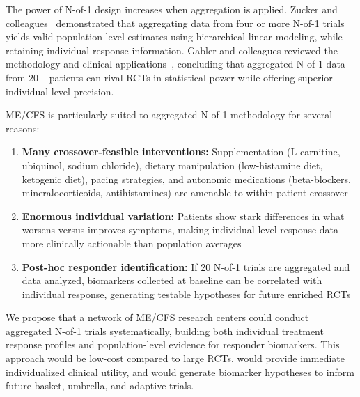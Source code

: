 The power of N-of-1 design increases when aggregation is applied. Zucker and colleagues~\cite{Zucker2010} demonstrated that aggregating data from four or more N-of-1 trials yields valid population-level estimates using hierarchical linear modeling, while retaining individual response information. Gabler and colleagues reviewed the methodology and clinical applications~\cite{Gabler2011}, concluding that aggregated N-of-1 data from 20+ patients can rival RCTs in statistical power while offering superior individual-level precision.

ME/CFS is particularly suited to aggregated N-of-1 methodology for several reasons:
\begin{enumerate}
    \item \textbf{Many crossover-feasible interventions:} Supplementation (L-carnitine, ubiquinol, sodium chloride), dietary manipulation (low-histamine diet, ketogenic diet), pacing strategies, and autonomic medications (beta-blockers, mineralocorticoids, antihistamines) are amenable to within-patient crossover
    \item \textbf{Enormous individual variation:} Patients show stark differences in what worsens versus improves symptoms, making individual-level response data more clinically actionable than population averages
    \item \textbf{Post-hoc responder identification:} If 20 N-of-1 trials are aggregated and data analyzed, biomarkers collected at baseline can be correlated with individual response, generating testable hypotheses for future enriched RCTs
\end{enumerate}

We propose that a network of ME/CFS research centers could conduct aggregated N-of-1 trials systematically, building both individual treatment response profiles and population-level evidence for responder biomarkers. This approach would be low-cost compared to large RCTs, would provide immediate individualized clinical utility, and would generate biomarker hypotheses to inform future basket, umbrella, and adaptive trials.




